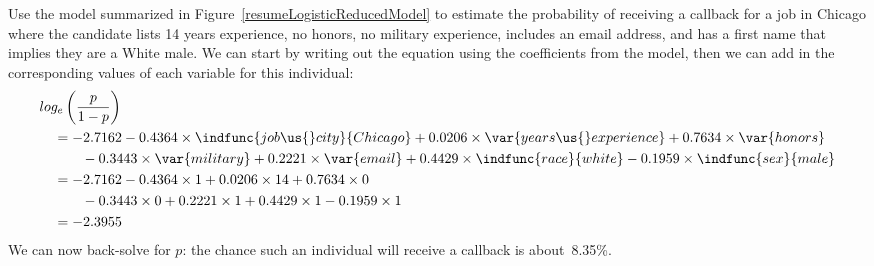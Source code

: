 \begin{examplewrap}
\begin{nexample}{Use the model summarized in
    Figure~\ref{resumeLogisticReducedModel}
    to estimate the probability
    of receiving a callback for a job in Chicago
    where the candidate lists 14 years experience,
    no honors,
    no military experience,
    includes an email address,
    and has a first name that implies they are a White male.}
  \label{exampleForResumeAndWhiteQuantified}%
  We can start by writing out the equation using the
  coefficients from the model, then we can
  add in the corresponding values of each variable for this
  individual:
  \begin{align*}
  &log_e \left(\frac{p}{1 - p}\right) \\
    &\quad= - 2.7162
        - 0.4364 \times \indfunc{job\us{}city}{Chicago}
        + 0.0206 \times \var{years\us{}experience}
        + 0.7634 \times \var{honors} \\
      &\quad\qquad
          - 0.3443 \times \var{military}
          + 0.2221 \times \var{email}
          + 0.4429 \times \indfunc{race}{white}
          - 0.1959 \times \indfunc{sex}{male} \\
    &\quad= - 2.7162
        - 0.4364 \times 1
        + 0.0206 \times 14
        + 0.7634 \times 0 \\
      &\quad\qquad
          - 0.3443 \times 0
          + 0.2221 \times 1
          + 0.4429 \times 1
          - 0.1959 \times 1 \\
    &\quad= - 2.3955
  \end{align*}
  We can now back-solve for $p$:
  the chance such an individual will receive
  a callback is about~8.35\%.
\end{nexample}
\end{examplewrap}

